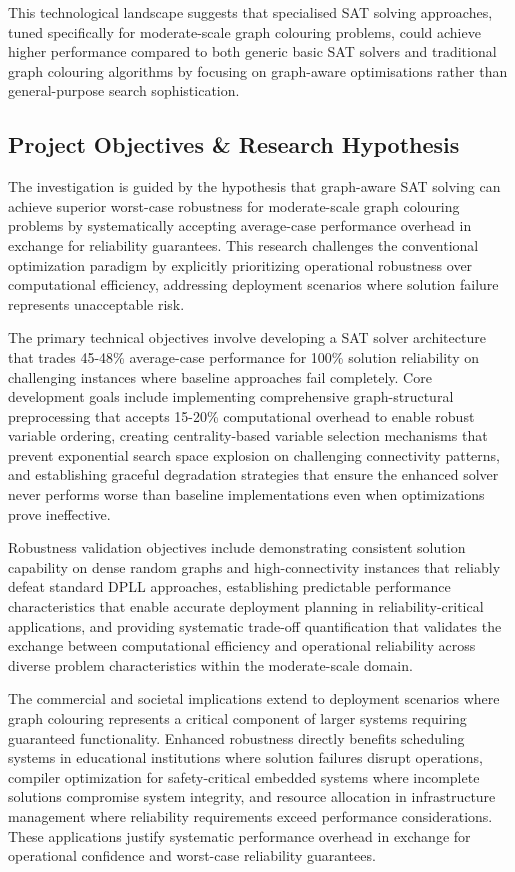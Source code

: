 This technological landscape suggests that specialised SAT solving approaches, tuned specifically for moderate-scale graph colouring problems, could achieve higher performance compared to both generic basic SAT solvers and traditional graph colouring algorithms by focusing on graph-aware optimisations rather than general-purpose search sophistication.

\subsection{Project Objectives \& Research Hypothesis}

The investigation is guided by the hypothesis that graph-aware SAT solving can achieve superior worst-case robustness for moderate-scale graph colouring problems by systematically accepting average-case performance overhead in exchange for reliability guarantees. This research challenges the conventional optimization paradigm by explicitly prioritizing operational robustness over computational efficiency, addressing deployment scenarios where solution failure represents unacceptable risk.

The primary technical objectives involve developing a SAT solver architecture that trades 45-48\% average-case performance for 100\% solution reliability on challenging instances where baseline approaches fail completely. Core development goals include implementing comprehensive graph-structural preprocessing that accepts 15-20\% computational overhead to enable robust variable ordering, creating centrality-based variable selection mechanisms that prevent exponential search space explosion on challenging connectivity patterns, and establishing graceful degradation strategies that ensure the enhanced solver never performs worse than baseline implementations even when optimizations prove ineffective.

Robustness validation objectives include demonstrating consistent solution capability on dense random graphs and high-connectivity instances that reliably defeat standard DPLL approaches, establishing predictable performance characteristics that enable accurate deployment planning in reliability-critical applications, and providing systematic trade-off quantification that validates the exchange between computational efficiency and operational reliability across diverse problem characteristics within the moderate-scale domain.

The commercial and societal implications extend to deployment scenarios where graph colouring represents a critical component of larger systems requiring guaranteed functionality. Enhanced robustness directly benefits scheduling systems in educational institutions where solution failures disrupt operations, compiler optimization for safety-critical embedded systems where incomplete solutions compromise system integrity, and resource allocation in infrastructure management where reliability requirements exceed performance considerations. These applications justify systematic performance overhead in exchange for operational confidence and worst-case reliability guarantees.


